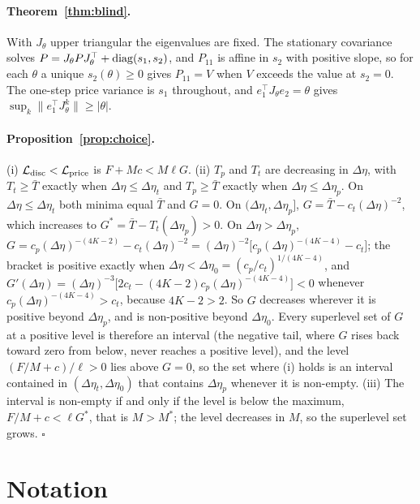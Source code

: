 \paragraph{Theorem~\ref{thm:blind}.} With $J_\theta$ upper triangular the eigenvalues are fixed. The stationary covariance solves $P=J_\theta PJ_\theta^\top+{\rm diag}(s_1,s_2)$, and $P_{11}$ is affine in $s_2$ with positive slope, so for each $\theta$ a unique $s_2(\theta)\ge0$ gives $P_{11}=V$ when $V$ exceeds the value at $s_2=0$. The one-step price variance is $s_1$ throughout, and $e_1^\top J_\theta e_2=\theta$ gives $\sup_k\|e_1^\top J_\theta^k\|\ge|\theta|$.

\paragraph{Proposition~\ref{prop:choice}.} (i) $\mathcal L_{\rm disc}<\mathcal L_{\rm price}$ is $F+Mc<M\ell G$. (ii) $T_p$ and $T_t$ are decreasing in $\Delta\eta$, with $T_t\ge\bar T$ exactly when $\Delta\eta\le\Delta\eta_t$ and $T_p\ge\bar T$ exactly when $\Delta\eta\le\Delta\eta_p$. On $\Delta\eta\le\Delta\eta_t$ both minima equal $\bar T$ and $G=0$. On $(\Delta\eta_t,\Delta\eta_p]$, $G=\bar T-c_t(\Delta\eta)^{-2}$, which increases to $G^*=\bar T-T_t(\Delta\eta_p)>0$. On $\Delta\eta>\Delta\eta_p$, $G=c_p(\Delta\eta)^{-(4K-2)}-c_t(\Delta\eta)^{-2}=(\Delta\eta)^{-2}\bigl[c_p(\Delta\eta)^{-(4K-4)}-c_t\bigr]$; the bracket is positive exactly when $\Delta\eta<\Delta\eta_0=(c_p/c_t)^{1/(4K-4)}$, and $G'(\Delta\eta)=(\Delta\eta)^{-3}\bigl[2c_t-(4K-2)c_p(\Delta\eta)^{-(4K-4)}\bigr]<0$ whenever $c_p(\Delta\eta)^{-(4K-4)}>c_t$, because $4K-2>2$. So $G$ decreases wherever it is positive beyond $\Delta\eta_p$, and is non-positive beyond $\Delta\eta_0$. Every superlevel set of $G$ at a positive level is therefore an interval (the negative tail, where $G$ rises back toward zero from below, never reaches a positive level), and the level $(F/M+c)/\ell>0$ lies above $G=0$, so the set where (i) holds is an interval contained in $(\Delta\eta_t,\Delta\eta_0)$ that contains $\Delta\eta_p$ whenever it is non-empty. (iii) The interval is non-empty if and only if the level is below the maximum, $F/M+c<\ell G^*$, that is $M>M^*$; the level decreases in $M$, so the superlevel set grows. $\square$

\section{Notation}\label{app:notation}


